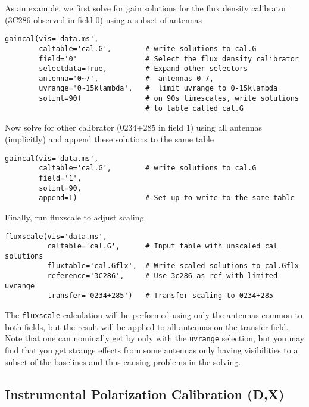 As an example, we first solve for gain solutions for the flux density
calibrator (3C286 observed in field 0) using a subset of antennas
\small
\begin{verbatim}
gaincal(vis='data.ms',
        caltable='cal.G',        # write solutions to cal.G
        field='0'                # Select the flux density calibrator
        selectdata=True,         # Expand other selectors
        antenna='0~7',           #  antennas 0-7,
        uvrange='0~15klambda',   #  limit uvrange to 0-15klambda
        solint=90)               # on 90s timescales, write solutions
                                 # to table called cal.G
\end{verbatim}
\normalsize
Now solve for other calibrator (0234+285 in field 1) using all antennas
(implicitly) and append these solutions to the same table
\small
\begin{verbatim}
gaincal(vis='data.ms',
        caltable='cal.G',        # write solutions to cal.G
        field='1',
        solint=90,
        append=T)                # Set up to write to the same table
\end{verbatim}
\normalsize
Finally, run fluxscale to adjust scaling
\small
\begin{verbatim}
fluxscale(vis='data.ms',
          caltable='cal.G',      # Input table with unscaled cal solutions
          fluxtable='cal.Gflx',  # Write scaled solutions to cal.Gflx
          reference='3C286',     # Use 3c286 as ref with limited uvrange
          transfer='0234+285')   # Transfer scaling to 0234+285
\end{verbatim}
\normalsize

The {\tt fluxscale} calculation will be performed using only the
antennas common 
to both fields, but the result will be applied to all antennas on the
transfer field.  Note that one can nominally get by only with the
{\tt uvrange} selection, but you may find that you get strange
effects from some antennas only having visibilities to a subset of
the baselines and thus causing problems in the solving.

\subsection{Instrumental Polarization Calibration (D,X)}
\label{section:cal.solve.pol}

